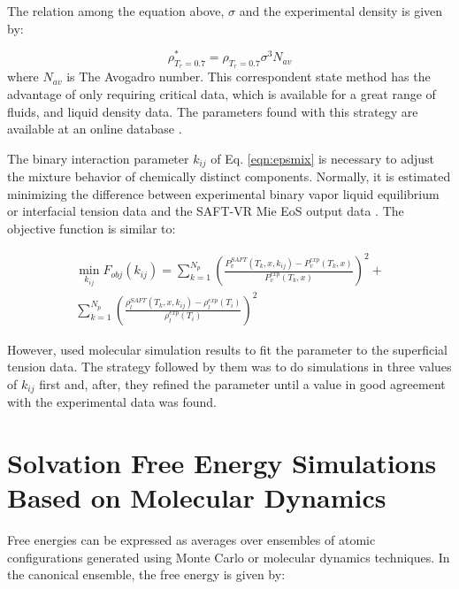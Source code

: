 	The relation among the equation above, $\sigma$ and the experimental density is given by:
	
	\begin{equation}
	\rho_{T_{r}=0.7}^{*} = \rho_{T_{r}=0.7}\sigma^{3}N_{av}   
	\label{eqn:sigmacorre}
	\end{equation}
	where $N_{av}$ is The Avogadro number. This correspondent state method has the advantage of only requiring critical data, which is available for a great range of fluids, and liquid density data. The parameters found with this strategy are available at an online database \cite{ervik2016}.     
	
	The binary interaction parameter $k_{ij}$ of Eq. \eqref{eqn:epsmix} is necessary to adjust the mixture behavior of chemically distinct components. Normally, it is estimated minimizing the difference between experimental binary vapor liquid equilibrium or interfacial tension data and the SAFT-VR Mie EoS output data \cite{muller2017,lobanova2016}. The objective function is similar to: 
	
	\begin{equation}
	\begin{aligned}
	\min\limits_{k_{ij}} F_{obj}(k_{ij})= \sum_{k=1}^{N_{p}} \left(\frac{P_{v}^{SAFT}(T_{k},x,k_{ij})-P_{v}^{exp}(T_{k},x)}{P_{v}^{exp}(T_{k},x)} \right)^2 +\\
	\sum_{k=1}^{N_{p}} \left(\frac{\rho_{l}^{SAFT}(T_{k},x,k_{ij})-\rho_{l}^{exp}(T_{i})}{\rho_{l}^{exp}(T_{i})} \right)^2
	\end{aligned}
	\label{eqn:fobjmix}
	\end{equation}
	
	However,  used molecular simulation results to fit the parameter to the superficial tension data. The strategy followed by them was to do simulations in three values of $k_{ij}$ first and, after, they refined the parameter until a value in good agreement with the experimental data was found. 
	
\section{Solvation Free Energy Simulations Based on Molecular Dynamics}
	
	Free energies can be expressed as averages over ensembles of atomic configurations generated using Monte Carlo or molecular dynamics techniques. In the canonical ensemble, the free energy is given by:  
	
